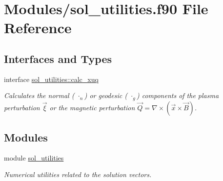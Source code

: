 \hypertarget{sol__utilities_8f90}{}\section{Modules/sol\+\_\+utilities.f90 File Reference}
\label{sol__utilities_8f90}
\subsection*{Interfaces and Types}
\begin{DoxyCompactItemize}
\item 
interface \hyperlink{interfacesol__utilities_1_1calc__xuq}{sol\+\_\+utilities\+::calc\+\_\+xuq}
\begin{DoxyCompactList}\small\item\em Calculates the normal ( $\cdot_n$) or geodesic ( $\cdot_g$) components of the plasma perturbation $\vec{\xi}$ or the magnetic perturbation $\vec{Q} = \nabla \times \left(\vec{x} \times \vec{B}\right)$. \end{DoxyCompactList}\end{DoxyCompactItemize}
\subsection*{Modules}
\begin{DoxyCompactItemize}
\item 
module \hyperlink{namespacesol__utilities}{sol\+\_\+utilities}
\begin{DoxyCompactList}\small\item\em Numerical utilities related to the solution vectors. \end{DoxyCompactList}\end{DoxyCompactItemize}
